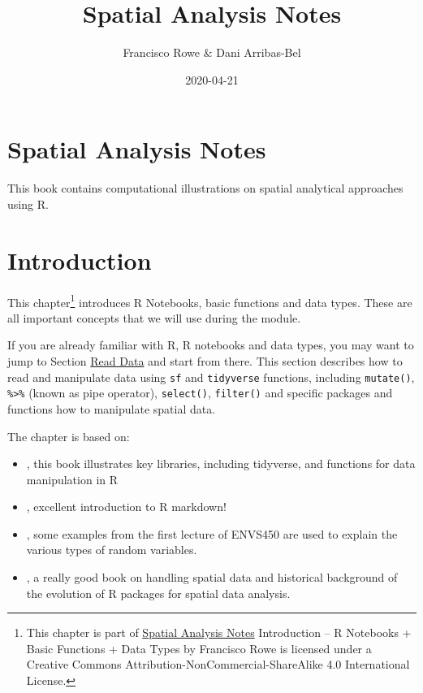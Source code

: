 \documentclass[]{book}
\title{Spatial Analysis Notes}
\author{Francisco Rowe \& Dani Arribas-Bel}
\date{2020-04-21}
\begin{document}
\maketitle

{
\setcounter{tocdepth}{1}
\tableofcontents
}
\chapter{Spatial Analysis Notes}\label{spatial-analysis-notes}

This book contains computational illustrations on spatial analytical
approaches using R.

\chapter{Introduction}\label{intro}

This chapter\footnote{This chapter is part of \href{index.html}{Spatial
  Analysis Notes} {Introduction -- R Notebooks + Basic Functions + Data
  Types} by Francisco Rowe is licensed under a Creative Commons
  Attribution-NonCommercial-ShareAlike 4.0 International License.}
introduces R Notebooks, basic functions and data types. These are all
important concepts that we will use during the module.

If you are already familiar with R, R notebooks and data types, you may
want to jump to Section \protect\hyperlink{sec_readdata}{Read Data} and
start from there. This section describes how to read and manipulate data
using \texttt{sf} and \texttt{tidyverse} functions, including
\texttt{mutate()}, \texttt{\%\textgreater{}\%} (known as pipe operator),
\texttt{select()}, \texttt{filter()} and specific packages and functions
how to manipulate spatial data.

The chapter is based on:

\begin{itemize}
\item
  \citet{grolemund_wickham_2019_book}, this book illustrates key
  libraries, including tidyverse, and functions for data manipulation in
  R
\item
  \citet{Xie_et_al_2019_book}, excellent introduction to R markdown!
\item
  \citet{envs450_2018}, some examples from the first lecture of ENVS450
  are used to explain the various types of random variables.
\item
  \citet{Lovelace_et_al_2020_book}, a really good book on handling
  spatial data and historical background of the evolution of R packages
  for spatial data analysis.
\end{itemize}
\end{document}
